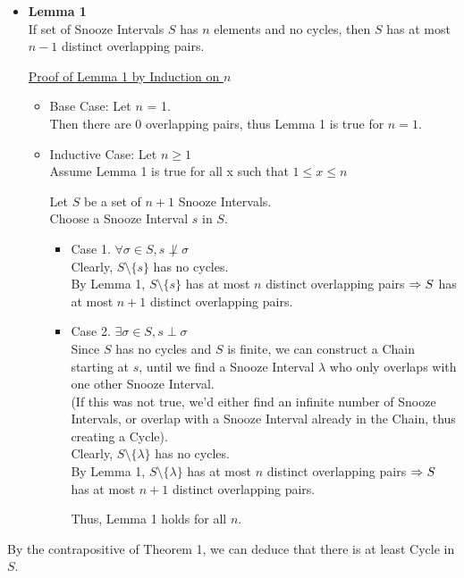 \documentclass[fleqn]{article}
\newcommand{\set}[1]{\lbrace #1 \rbrace}
\newcommand{\ioverlap}{\perp}
\begin{document}
\begin{itemize}
  \item \textbf{Lemma 1}\\
        If set of Snooze Intervals $S$ has $n$ elements and no cycles,
        then $S$ has at most $n-1$ distinct overlapping pairs.

        \underline{Proof of Lemma 1 by Induction on $n$}
        \begin{itemize}
          \item Base Case: Let $n$ = 1.\\
                Then there are 0 overlapping pairs, thus
                Lemma 1 is true for $n=1$.
          \item Inductive Case: Let $n \geq 1$\\
                Assume Lemma 1 is true for all x such that $1 \leq x \leq n$

                Let $S$ be a set of $n+1$ Snooze Intervals.\\
                Choose a Snooze Interval $s$ in $S$.

                \begin{itemize}
                  \item Case 1. $\forall \sigma \in S, s \not\ioverlap \sigma$\\
                        Clearly, $S \setminus \set{s}$ has no cycles.\\
                        By Lemma 1, $S \setminus \set{s}$ has at most 
                        $n$ distinct overlapping pairs $\Rightarrow\\
                        S$ has at most $n+1$ distinct overlapping pairs.
                  \item Case 2. $\exists \sigma \in S, s \ioverlap \sigma$\\
                        Since $S$ has no cycles and $S$ is finite, we
                        can construct a Chain starting at $s$, until
                        we find a Snooze Interval $\lambda$ who only
                        overlaps with one other Snooze Interval.\\
                        (If this was not true, we'd either find an
                         infinite number of Snooze Intervals, or 
                         overlap with a Snooze Interval already in 
                         the Chain, thus creating a Cycle).\\
                        Clearly, $S \setminus \set{\lambda}$ has no cycles.\\
                        By Lemma 1, $S \setminus \set{\lambda}$ has at
                        most $n$ distinct overlapping pairs $\Rightarrow\\
                        S$ has at most $n+1$ distinct overlapping pairs.
                        
                        Thus, Lemma 1 holds for all $n$.
                \end{itemize}
        \end{itemize}

\end{itemize}
By the contrapositive of Theorem 1, we can deduce that there is at least Cycle in $S$. 
\end{document}
